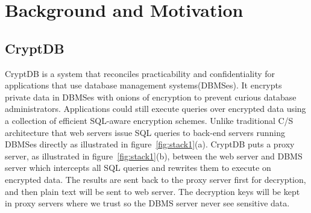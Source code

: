 \section{Background and Motivation}

\subsection{CryptDB}
CryptDB is a system that reconciles practicability and confidentiality for applications that use database management systems(DBMSes). 
It encrypts private data in DBMSes with onions of encryption to prevent curious database administrators. 
Applications could still execute queries over encrypted data using a collection of efficient SQL-aware encryption schemes. 
Unlike traditional C/S architecture that web servers issue SQL queries to back-end servers running DBMSes directly as illustrated in figure~\ref{fig:stack1}(a). 
CryptDB puts a proxy server, as illustrated in figure~\ref{fig:stack1}(b), between the web server and DBMS server which intercepts all SQL queries and rewrites them to execute on encrypted data. 
The results are sent back to the proxy server first for decryption, and then plain text will be sent to web server. 
The decryption keys will be kept in proxy servers where we trust so the DBMS server never see sensitive data.






